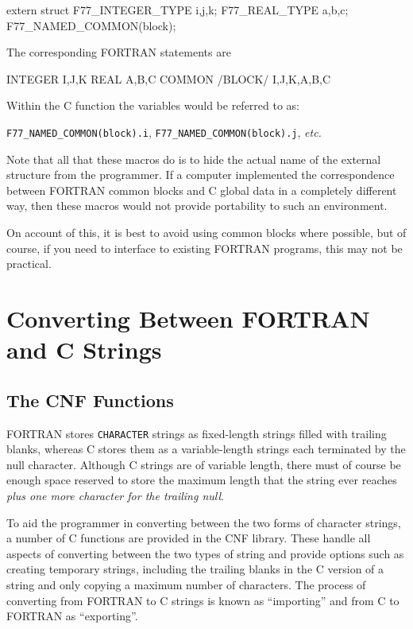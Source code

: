 \documentclass[twoside,11pt,nolof]{starlink}
\begin{document}
\begin{small}
\begin{terminalv}
extern struct
{
 F77_INTEGER_TYPE i,j,k;
 F77_REAL_TYPE a,b,c;
} F77_NAMED_COMMON(block);
\end{terminalv}
\end{small}

The corresponding FORTRAN statements are

\begin{small}
\begin{terminalv}
      INTEGER I,J,K
      REAL A,B,C
      COMMON /BLOCK/ I,J,K,A,B,C
\end{terminalv}
\end{small}

Within the C function the variables would be referred to as:

\texttt{F77\_\-NAMED\_\-COMMON(block).i},
\texttt{F77\_\-NAMED\_\-COMMON(block).j},
\textit{etc.}

Note that all that these macros do is to hide the actual name of the external
structure from the programmer. If a computer implemented the correspondence
between FORTRAN common blocks and C global data in a completely different way,
then these macros would not provide portability to such an environment.

On account of this, it is best to avoid using common blocks where possible, but
of course, if you need to interface to existing FORTRAN programs, this may not
be practical.

\section{Converting Between FORTRAN and C Strings}

\subsection{\label{cnf}The CNF Functions}
FORTRAN stores \texttt{CHARACTER} strings as fixed-length strings
filled with trailing blanks, whereas C stores them as a variable-length strings
each terminated by the null character.
Although C strings are of variable length,
there must of course be enough space reserved to store the maximum length that
the string ever reaches \textit{plus one more character for the trailing null}.

To aid the programmer in converting between the two forms of character strings,
a number of C functions are provided in the CNF library.
These handle all aspects of converting between the two types of string and
provide options such as creating temporary strings, including the trailing
blanks in the C version of a string and only copying a maximum number of
characters.
The process of converting from FORTRAN to C strings is known as ``importing''
and from C to FORTRAN as ``exporting''.
\end{document}
